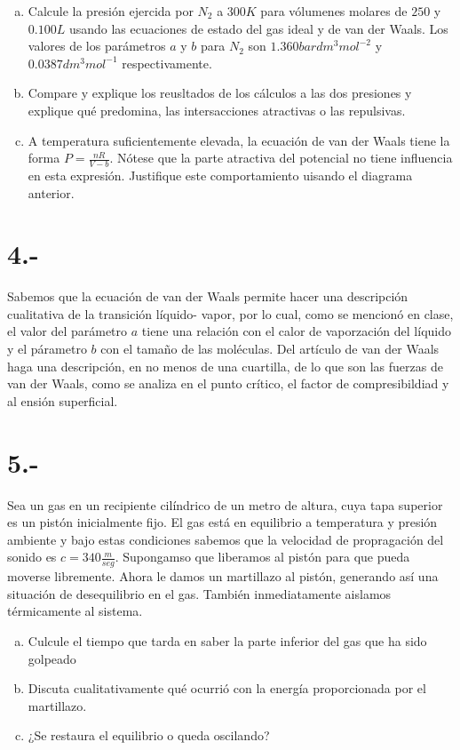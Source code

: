 \documentclass{article}
\begin{document}
\begin{enumerate}[a)]
    \item Calcule la presión ejercida por $N_2$ a $300K$ para vólumenes molares de 
    $250$ y $0.100L$ usando las ecuaciones de estado del gas ideal y de van der Waals.
    Los valores de los parámetros $a$ y $b$ para $N_2$ son $1.360bar dm^3 mol^{-2}$ y
    $0.0387 dm^3 mol^{-1}$ respectivamente. 
    
    \item Compare y explique los reusltados de los cálculos a las dos presiones y 
    explique qué predomina, las intersacciones atractivas o las repulsivas.

    \item A temperatura suficientemente elevada, la ecuación de van der Waals tiene 
    la forma $P = \frac{nR}{V-b}$. Nótese que la parte atractiva del potencial no tiene 
    influencia en esta expresión. Justifique este comportamiento uisando el diagrama 
    anterior.
\end{enumerate}

\section*{4.-}
Sabemos que la ecuación de van der Waals permite hacer una descripción cualitativa 
de la transición líquido- vapor, por lo cual, como se mencionó en clase, el 
valor del parámetro $a$ tiene una relación con el calor de vaporzación del líquido y 
el párametro $b$  con el tamaño de las moléculas. Del artículo de van der Waals haga 
una descripción, en no menos de una cuartilla, de lo que son las fuerzas de 
van der Waals, como se analiza en el punto crítico, el factor de compresibildiad y al 
ensión superficial.

\section*{5.-}
Sea un gas en un recipiente cilíndrico de un metro de altura, cuya tapa superior es 
un pistón inicialmente fijo. El gas está en equilibrio a temperatura y presión ambiente
y bajo estas condiciones sabemos que la velocidad de propragación del sonido es 
$c = 340 \frac{m}{seg}$. Supongamso que liberamos al pistón para que pueda moverse 
libremente. Ahora le damos un martillazo al pistón, generando así una situación de
desequilibrio en el gas. También inmediatamente aislamos térmicamente al sistema. 
\begin{enumerate}[a)]
    \item Culcule el tiempo que tarda en saber la parte inferior del gas que ha sido 
    golpeado 

    \item Discuta cualitativamente qué ocurrió con la energía proporcionada por el 
    martillazo. 

    \item ¿Se restaura el equilibrio o queda oscilando?
\end{enumerate}
\end{document}
